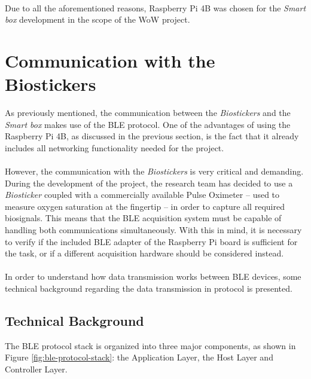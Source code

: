 \paragraph{} Due to all the aforementioned reasons, Raspberry Pi 4B was chosen for the \textit{Smart box} development in the scope of the \acs{WoW} project.

\section{Communication with the Biostickers}

As previously mentioned, the communication between the \textit{Biostickers} and the \textit{Smart box} makes use of the \acs{BLE} protocol. One of the advantages of using the Raspberry Pi 4B, as discussed in the previous section, is the fact that it already includes all networking functionality needed for the project. 

\paragraph{} However, the communication with the \textit{Biostickers} is very critical and demanding. During the development of the project, the research team has decided to use a \textit{Biosticker} coupled with a commercially available Pulse Oximeter%
-- used to measure oxygen saturation at the fingertip --  in order to capture all required biosignals. This means that the \acs{BLE} acquisition system must be capable of handling both communications simultaneously. With this in mind, it is necessary to verify if the included \acs{BLE} adapter of the Raspberry Pi board is sufficient for the task, or if a different acquisition hardware should be considered instead.

\paragraph{} In order to understand how data transmission works between \acs{BLE} devices, some technical background regarding the data transmission in protocol is presented.

\subsection{Technical Background} 
The \acs{BLE} protocol stack is organized into three major components, as shown in Figure \ref{fig:ble-protocol-stack}: the Application Layer, the Host Layer and Controller Layer. 

